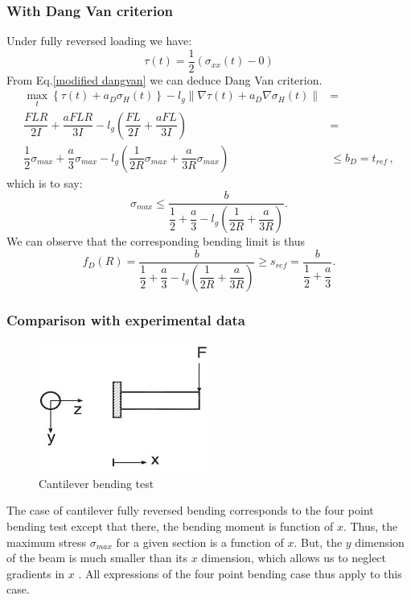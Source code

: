 \subsubsection{With Dang Van criterion}  
Under fully reversed loading we have:
$$\tau(t)=\dfrac{1}{2}(\sigma_{xx}(t)-0)$$ 
From Eq.\eqref{modified dangvan} we can deduce Dang Van criterion.
\begin{equation}
	\begin{split}
		\max \limits_{t}\left\{\tau{(t)}+a_D\sigma_H(t)\right\}-l_g\parallel{\nabla\tau{(t)}}+a_D\nabla\sigma_H(t)\parallel&=\\ \dfrac{FLR}{2I} +\dfrac{aFLR}{3I}-l_g\left( \dfrac{FL}{2I}+\dfrac{aFL}{3I}\right) &=\\ \dfrac{1}{2}\sigma_{max}+\dfrac{a}{3}\sigma_{max}-l_g\left( \dfrac{1}{2R}\sigma_{max}+\dfrac{a}{3R}\sigma_{max}\right) &\leqslant b_D= t_{ref}\, ,
	\end{split}
\end{equation}
which is to say:
\begin{equation}
	\sigma_{max}\leqslant\dfrac{b}{\dfrac{1}{2}+\dfrac{a}{3}-l_g\left( \dfrac{1}{2R}+\dfrac{a}{3R}\right) }.
\end{equation}
We can observe that the corresponding bending limit is thus
\begin{equation}f_D(R)=\dfrac{b}{\dfrac{1}{2}+\dfrac{a}{3}-l_g\left( \dfrac{1}{2R}+\dfrac{a}{3R}\right) }\geqslant s_{ref} = \dfrac{b}{\dfrac{1}{2}+\dfrac{a}{3}}.
\end{equation}


\subsubsection{Comparison with experimental data}
\begin{figure}[!h]
	\begin{center}
		\includegraphics[width=0.5\textwidth]{figures//fig3.jpg} 
		\caption{Cantilever bending test\cite{Papadopoulos1996513}}
		\label{fig9}
	\end{center}
\end{figure}
The case of cantilever fully reversed bending corresponds to the four point bending test except that there, the bending moment is function of $x$. Thus, the maximum stress $\sigma_{max}$ for a given section is a function of $x$. But, the $y$ dimension of the beam is much smaller than its $x$ dimension, which allows us to neglect gradients in $x$ . All  expressions of the four point bending case thus  apply to this case. 

